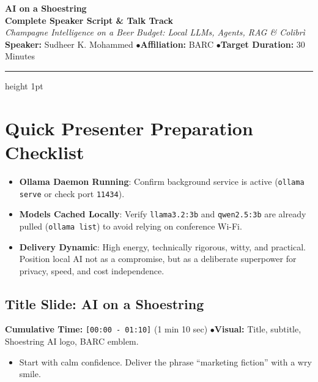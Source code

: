 \documentclass[11pt,a4paper]{article}
\begin{document}
\begin{center}
    {\Huge \textbf{\color{ShoeNavy}AI on a Shoestring}}\\[4pt]
    {\Large \textbf{\color{ShoeCoral}Complete Speaker Script \& Talk Track}}\\[2pt]
    {\normalsize \textit{Champagne Intelligence on a Beer Budget: Local LLMs, Agents, RAG \& Colibr\`i}}\\[6pt]
    \textbf{Speaker:} Sudheer K. Mohammed \quad$\bullet$\quad \textbf{Affiliation:} BARC \quad$\bullet$\quad \textbf{Target Duration:} 30 Minutes
\end{center}
\vspace{0.3cm}
\hrule height 1pt
\vspace{0.4cm}

\section*{Quick Presenter Preparation Checklist}
\begin{itemize}
    \item[\checkmark] \textbf{Ollama Daemon Running}: Confirm background service is active (\texttt{ollama serve} or check port \texttt{11434}).
    \item[\checkmark] \textbf{Models Cached Locally}: Verify \texttt{llama3.2:3b} and \texttt{qwen2.5:3b} are already pulled (\texttt{ollama list}) to avoid relying on conference Wi-Fi.
    \item[\checkmark] \textbf{Delivery Dynamic}: High energy, technically rigorous, witty, and practical. Position local AI not as a compromise, but as a deliberate superpower for privacy, speed, and cost independence.
\end{itemize}

\vspace{0.3cm}

\subsection{Title Slide: AI on a Shoestring}
\begin{directionbox}
    \textbf{Cumulative Time:} \texttt{[00:00 - 01:10]} (1 min 10 sec) \quad$\bullet$\quad \textbf{Visual:} Title, subtitle, Shoestring AI logo, BARC emblem.
    \begin{itemize}
        \item Start with calm confidence. Deliver the phrase ``marketing fiction'' with a wry smile.
    \end{itemize}
\end{directionbox}
\end{document}
